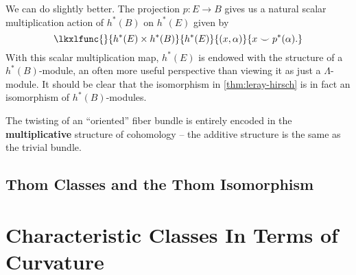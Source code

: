 We can do slightly better. The projection $p : E \to B$ gives us a natural scalar multiplication action of $h^*(B)$ on $h^*(E)$ given by
\[
	\lkxlfunc{}{h^*(E)\times h^*(B)}{h^*(E)}{(x, \alpha)}{x\smile p^*(\alpha).}
\]
With this scalar multiplication map, $h^*(E)$ is endowed with the structure of a $h^*(B)$-module, an often more useful perspective than viewing it as just a $\Lambda$-module. It should be clear that the isomorphism in \cref{thm:leray-hirsch} is in fact an isomorphism of $h^*(B)$-modules.


\begin{insight}
	The twisting of an ``oriented'' fiber bundle is entirely encoded in the \textbf{multiplicative} structure of cohomology -- the additive structure is the same as the trivial bundle.
\end{insight}

\subsection{Thom Classes and the Thom Isomorphism}

\section{Characteristic Classes In Terms of Curvature}

